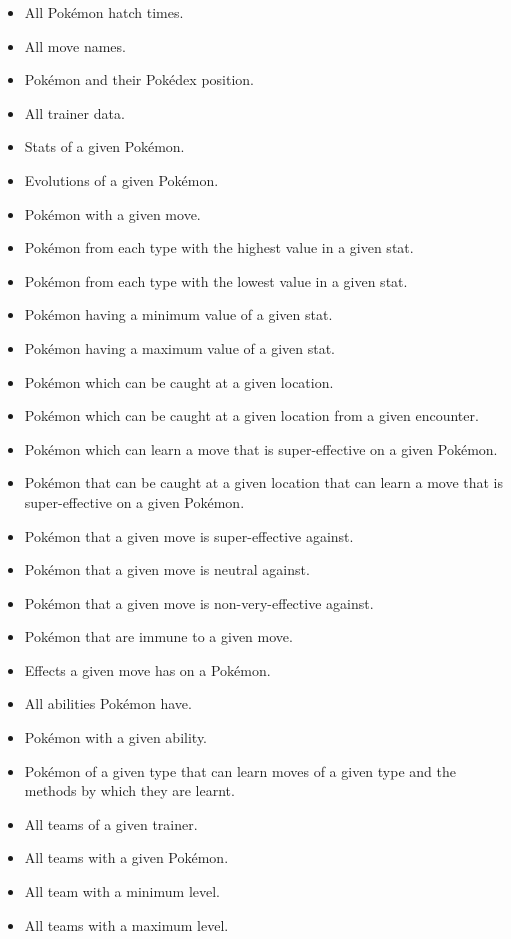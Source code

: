 \documentclass{article}
\begin{document}
\begin{itemize}
    \item All Pok\'emon hatch times.
    \item All move names.
    \item Pok\'emon and their Pok\'edex position.
    \item All trainer data.
    \item Stats of a given Pok\'emon.
    \item Evolutions of a given Pok\'emon.
    \item Pok\'emon with a given move.
    \item Pok\'emon from each type with the highest value in a given stat.
    \item Pok\'emon from each type with the lowest value in a given stat.
    \item Pok\'emon having a minimum value of a given stat.
    \item Pok\'emon having a maximum value of a given stat.
    \item Pok\'emon which can be caught at a given location.
    \item Pok\'emon which can be caught at a given location from a given encounter.
    \item Pok\'emon which can learn a move that is super-effective on a given Pok\'emon.
    \item Pok\'emon that can be caught at a given location that can learn a move that is 
        super-effective on a given Pok\'emon.
    \item Pok\'emon that a given move is super-effective against.
    \item Pok\'emon that a given move is neutral against.
    \item Pok\'emon that a given move is non-very-effective against.
    \item Pok\'emon that are immune to a given move.
    \item Effects a given move has on a Pok\'emon.
    \item All abilities Pok\'emon have.
    \item Pok\'emon with a given ability.
    \item Pok\'emon of a given type that can learn moves of a given type and the methods by which
        they are learnt.
    \item All teams of a given trainer.
    \item All teams with a given Pok\'emon.
    \item All team with a minimum level.
    \item All teams with a maximum level.

\end{itemize}
\end{document}
